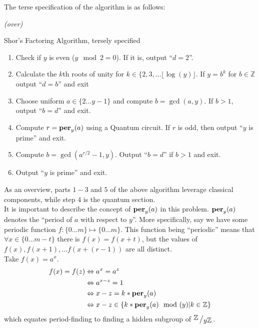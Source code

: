 \documentclass{exam} %
\newcommand{\m}[1]{\mathbb{#1}}    %
\theoremstyle{plain}
\theoremstyle{definition}
\theoremstyle{remark}
\numberwithin{equation}{section}  %
\newcommand{\per}{\text{\textbf{per}}}
\newcommand{\bigslant}[2]{{\raisebox{.2em}{$#1$}\left/\raisebox{-.2em}{$#2$}\right.}}
\begin{document}
The terse specification of the algorithm is as follows:\\
\begin{center}
  \vspace*{1cm}
  \textit{(over)}
\end{center}
\begin{algorithm}[H]
  \SetAlgoLined
  \caption{Shor's Factoring Algorithm, tersely specified}
  \begin{enumerate}
    \item Check if $y$ is even ($y \mod 2 = 0$). If it is, output ``$d=2$''.
    \item Calculate the $k$th roots of unity for $k \in \{ 2, 3, \hdots \lfloor
      \log(y)\rfloor$. If $y = b^k$ for $b \in \m{Z}$ output ``$d = b$'' and exit
    \item Choose uniform $a \in \{2\hdots y-1\}$ and compute $b = \gcd(a, y)$.
      If $b > 1$, output ``$b = d$'' and exit.
    \item Compute $r = \per_y(a)$ using a Quantum circuit. If $r$ is odd, 
      then output ``$y$ is prime'' and exit.
    \item Compute $b = \gcd(a^{r/2}-1, y)$. Output ``$b = d$'' if $b > 1$ and 
      exit. 
    \item Output ``$y$ is prime'' and exit.
  \end{enumerate}
\end{algorithm}

As an overview, parts $1-3$ and $5$ of the above algorithm leverage 
classical components, while step $4$ is the quantum section.\\

It is important to describe the concept of $\per_y(a)$ in this problem. $\per_y
(a)$ denotes the ``period of $a$ with respect to $y$''. More specifically, say
we have some periodic function $f: \{0\hdots m\} \mapsto \{0\hdots m\}$. This
function being ``periodic'' means that $\forall x\in \{0\hdots m-t\}$ there is
$f(x) = f(x+t)$, but the values of $f(x), f(x+1), \hdots f(x+(r-1))$ are all
distinct.\\

Take $f(x) = a^x$.
\begin{align*}
  f(x) = f(z) 
  & \Leftrightarrow a^x = a^z\\
  & \Leftrightarrow a^{x-z} = 1\\
  & \Leftrightarrow x - z = k * \per_y(a)\\
  & \Leftrightarrow x - z \in \{k * \per_y(a) \mod(y) | k\in \m{Z}\}\\
\end{align*}
which equates period-finding to finding a hidden subgroup of 
$\bigslant{\m{Z}}{y \m{Z}}$.\\
\end{document}
